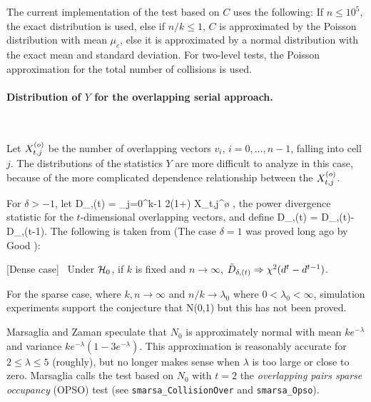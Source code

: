   The current implementation of the test based on $C$ uses the following:
  If $n \le 10^5$, the exact distribution is used,
  else  if $n/k \le 1$, $C$ is approximated by the Poisson
  distribution with mean $\mu_c$,
  else it is approximated by a normal distribution
  with the exact mean and standard deviation.
 For two-level tests, the
Poisson approximation for the total number of collisions is used.


\paragraph*{Distribution of $Y$ for the overlapping serial approach.} \

Let $X_{t,j}^{(o)}$ be the number of overlapping vectors $v_i$,
$i=0,\dots,n-1$, falling into cell $j$.
The distributions of the statistics $Y$ are more difficult to analyze
in this case, because of the more complicated dependence relationship
between the $X_{t,j}^{(o)}$.

For $\delta > -1$, let
\eq
 D_{\delta,(t)} = \sum_{j=0}^{k-1} {2\over \delta(1+\delta)} X_{t,j}^\o
          ,  \label{eq:Ddeltat}
\endeq
the power divergence statistic for the $t$-dimensional overlapping
vectors, and define
\eq
  \tilde D_{\delta,(t)} = D_{\delta,(t)}-D_{\delta,(t-1)}.
\endeq
The following is taken from \cite{rLEC02c}
(The case $\delta=1$ was proved long ago by Good \cite{rGOO53a}):

\begin {proposition} \null
{\rm [Dense case]} \ Under $\mathcal{H}_0$, if $k$ is fixed and $n\to\infty$,
$\tilde D_{\delta,(t)} \Rightarrow \chi^2(d^t-d^{t-1})$.
\end {proposition}

For the sparse case, where $k,n\to\infty$
and $n/k \to\lambda_0$ where $0<\lambda_0<\infty$,
simulation experiments support the conjecture that
\eq
  \To N(0,1)
\endeq
but this has not been proved.

Marsaglia and Zaman \cite{rMAR93b} speculate that $N_0$ is
approximately normal with mean $k e^{-\lambda}$ and variance
$k e^{-\lambda}(1-3e^{-\lambda})$.
This approximation is reasonably accurate for $2 \le \lambda\le 5$
(roughly), but no longer makes sense when $\lambda$ is too large or
close to zero.
Marsaglia \cite{rMAR85a} calls the test based on $N_0$ with $t=2$ the
{\em overlapping pairs sparse occupancy\/} (OPSO) test
(see {\tt smarsa\_CollisionOver} and {\tt smarsa\_Opso}).

